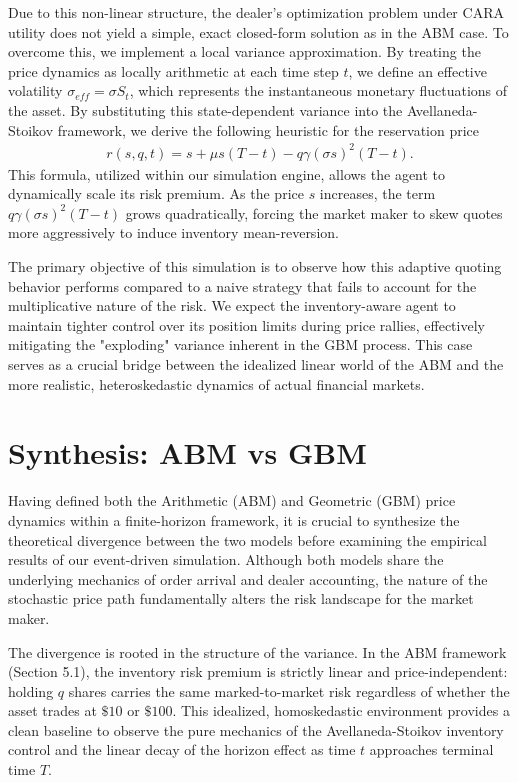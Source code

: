 \documentclass[a4paper,10pt,titlepage,oneside,openany]{book}
\theoremstyle{plain}\newtheorem{theorem}{Theorem}[chapter]
\theoremstyle{definition}\newtheorem{definition}{Definition}[chapter]
\theoremstyle{remark}\newtheorem{remark}{Remark}[chapter]
\begin{document}
Due to this non-linear structure, the dealer's optimization problem under CARA utility does not yield a simple, exact closed-form solution as in the ABM case. To overcome this, we implement a local variance approximation. By treating the price dynamics as locally arithmetic at each time step $t$, we define an effective volatility $\sigma_{eff} = \sigma S_t$, which represents the instantaneous monetary fluctuations of the asset. By substituting this state-dependent variance into the Avellaneda-Stoikov framework, we derive the following heuristic for the reservation price
\begin{align*}
    r(s, q, t) = s + \mu s(T-t) - q\gamma(\sigma s)^2(T-t).
\end{align*}
This formula, utilized within our simulation engine, allows the agent to dynamically scale its risk premium. As the price $s$ increases, the term $q\gamma(\sigma s)^2(T-t)$ grows quadratically, forcing the market maker to skew quotes more aggressively to induce inventory mean-reversion. 

The primary objective of this simulation is to observe how this adaptive quoting behavior performs compared to a naive strategy that fails to account for the multiplicative nature of the risk. We expect the inventory-aware agent to maintain tighter control over its position limits during price rallies, effectively mitigating the "exploding" variance inherent in the GBM process. This case serves as a crucial bridge between the idealized linear world of the ABM and the more realistic, heteroskedastic dynamics of actual financial markets.

\section{Synthesis: ABM vs GBM}

Having defined both the Arithmetic (ABM) and Geometric (GBM) price dynamics within a finite-horizon framework, it is crucial to synthesize the theoretical divergence between the two models before examining the empirical results of our event-driven simulation. Although both models share the underlying mechanics of order arrival and dealer accounting, the nature of the stochastic price path fundamentally alters the risk landscape for the market maker.

The divergence is rooted in the structure of the variance. In the ABM framework (Section 5.1), the inventory risk premium is strictly linear and price-independent: holding $q$ shares carries the same marked-to-market risk regardless of whether the asset trades at $\$10$ or $\$100$. This idealized, homoskedastic environment provides a clean baseline to observe the pure mechanics of the Avellaneda-Stoikov inventory control and the linear decay of the horizon effect as time $t$ approaches terminal time $T$.
\end{document}
